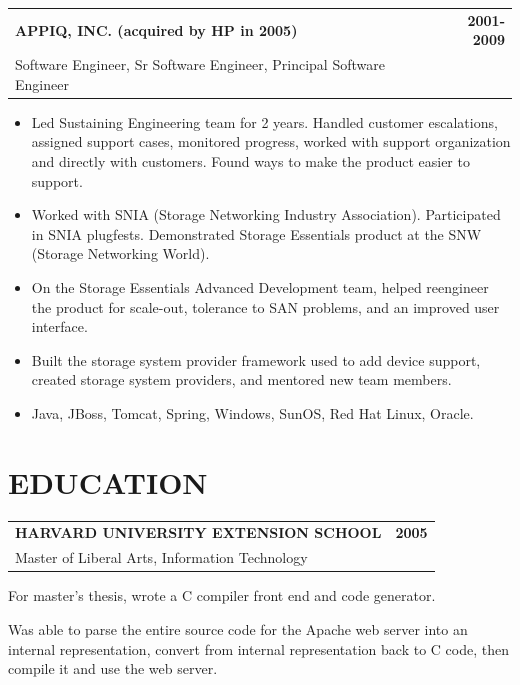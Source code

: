 \documentclass[11pt]{article}
\makeatletter
\newcommand{\resheader}[1]{\section*{#1}\vspace{-4pt}}
\newcommand{\jobheading}[4]{%
  \vspace{6pt}\begin{tabularx}{\textwidth}{@{}X r@{}}
    {\textbf{#1}} & {\textbf{#2}} \\
    {{\normalsize #3}\hspace{0.5em}{\color{muted}·}\hspace{0.5em}{\color{muted}#4}} & {} \\
  \end{tabularx}\vspace{2pt}
}
\makeatother
\begin{document}
\jobheading{APPIQ, INC. (acquired by HP in 2005)}{2001-2009}{Software Engineer, Sr Software Engineer, Principal Software Engineer}{Marlborough, MA}
\begin{itemize}
\item Led Sustaining Engineering team for 2 years. Handled customer escalations, assigned support cases, monitored progress, worked with support organization and directly with customers. Found ways to make the product easier to support.
\item Worked with SNIA (Storage Networking Industry Association). Participated in SNIA plugfests. Demonstrated Storage Essentials product at the SNW (Storage Networking World).
\item On the Storage Essentials Advanced Development team, helped reengineer the product for scale-out, tolerance to SAN problems, and an improved user interface.
\item Built the storage system provider framework used to add device support, created storage system providers, and mentored new team members.
\item Java, JBoss, Tomcat, Spring, Windows, SunOS, Red Hat Linux, Oracle.
\end{itemize}

\resheader{EDUCATION}

\jobheading{HARVARD UNIVERSITY EXTENSION SCHOOL}{2005}{Master of Liberal Arts, Information Technology}{Cambridge, MA}

For master's thesis, wrote a C compiler front end and code generator.

Was able to parse the entire source code for the Apache web server into an internal representation, convert from internal representation back to C code, then compile it and use the web server.
\end{document}
